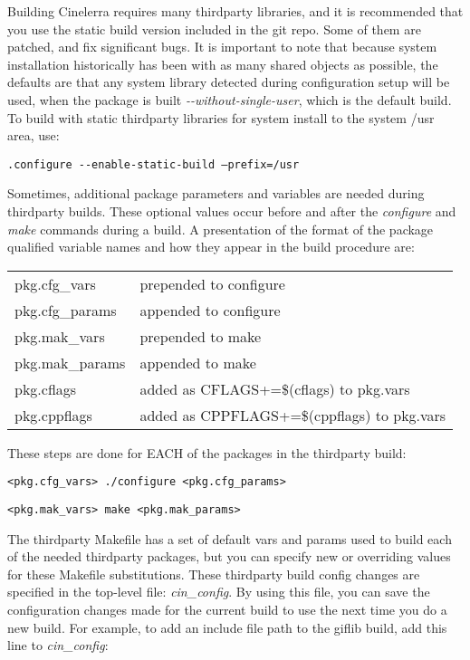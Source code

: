 Building Cinelerra requires many thirdparty libraries, and it is recommended that you use the static build version included in the git repo. Some of them are patched, and fix significant bugs. It is important to note that because system installation historically has been with as many shared objects as possible, the defaults are that any system library detected during configuration setup will be used, when the package is built \textit{-{}-without-single-user}, which is the default build. To build with static thirdparty libraries for system install to the system /usr area, use:

\hspace{2em}\texttt{.configure -{}-enable-static-build --prefix=/usr}

Sometimes, additional package parameters and variables are needed during thirdparty builds. These optional values occur before and after the \textit{configure} and \textit{make} commands during a build. A presentation of the format of the package qualified variable names and how they appear in the build procedure are:

\hspace{2em}
\begin{tabular}{@{}ll}
	pkg.cfg\_vars & prepended to configure\\
	pkg.cfg\_params & appended to configure\\
	pkg.mak\_vars & prepended to make\\
	pkg.mak\_params & appended to make\\
    pkg.cflags & added as CFLAGS+=\$(cflags) to pkg.vars\\
	pkg.cppflags & added as CPPFLAGS+=\$(cppflags) to pkg.vars\\
\end{tabular}

These steps are done for EACH of the packages in the thirdparty build:

\hspace{2em}\texttt{<pkg.cfg\_vars> ./configure <pkg.cfg\_params>}

\hspace{2em}\texttt{<pkg.mak\_vars> make <pkg.mak\_params>}

The thirdparty Makefile has a set of default vars and params used to build each of the needed thirdparty packages, but you can specify new or overriding values for these Makefile substitutions. These thirdparty build config changes are specified in the top-level file: \textit{cin\_config}. By using this file, you can save the configuration changes made for the current build to use the next time you do a new build. For example, to add an include file path to the giflib build, add this line to \textit{cin\_config}:

